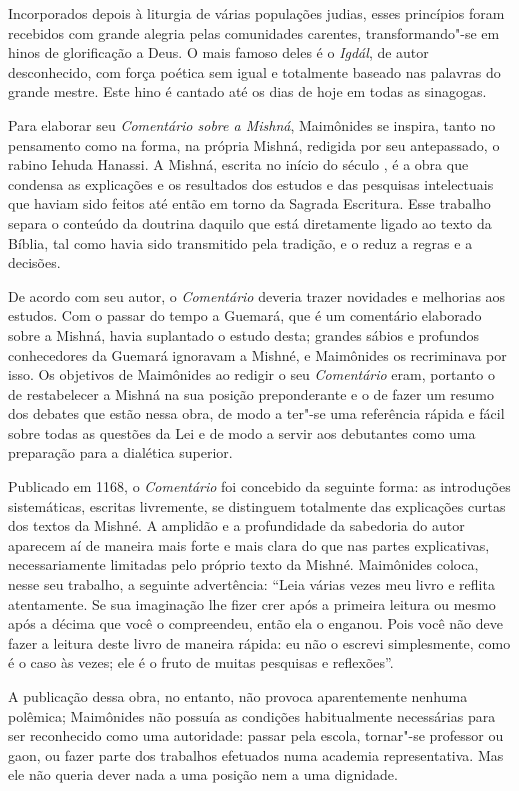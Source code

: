Incorporados depois à liturgia de várias populações judias, esses
princípios foram recebidos com grande alegria pelas comunidades
carentes, transformando"-se em hinos de glorificação a Deus. O mais
famoso deles é o \emph{Igdál}, de autor desconhecido, com força poética sem
igual e totalmente baseado nas palavras do grande mestre. Este hino é
cantado até os dias de hoje em todas as sinagogas.

Para elaborar seu \emph{Comentário sobre a Mishná}, Maimônides se
inspira, tanto no pensamento como na forma, na própria Mishná,
redigida por seu antepassado, o rabino Iehuda Hanassi. A Mishná, escrita no
início do século , é a obra que condensa as explicações e os
resultados dos estudos e das pesquisas intelectuais que haviam sido
feitos até então em torno da Sagrada Escritura. Esse trabalho separa o
conteúdo da doutrina daquilo que está diretamente ligado ao texto da
Bíblia, tal como havia sido transmitido pela tradição, e o reduz a
regras e a decisões.

De acordo com seu autor, o \emph{Comentário} deveria trazer novidades e
melhorias aos estudos. Com o passar do tempo a Guemará, que é um
comentário elaborado sobre a Mishná, havia suplantado o estudo
desta; grandes sábios e profundos conhecedores da Guemará
ignoravam a Mishné, e Maimônides os recriminava por isso. Os
objetivos de Maimônides ao redigir o seu \emph{Comentário} eram,
portanto o de restabelecer a Mishná na sua posição preponderante
e o de fazer um resumo dos debates que estão nessa obra, de modo a
ter"-se uma referência rápida e fácil sobre todas as questões da Lei e de
modo a servir aos debutantes como uma preparação para a dialética
superior.

Publicado em 1168, o \emph{Comentário} foi concebido da seguinte forma:
as introduções sistemáticas, escritas livremente, se distinguem
totalmente das explicações curtas dos textos da Mishné. A
amplidão e a profundidade da sabedoria do autor aparecem aí de maneira
mais forte e mais clara do que nas partes explicativas, necessariamente
limitadas pelo próprio texto da Mishné. Maimônides coloca, nesse
seu trabalho, a seguinte advertência: ``Leia várias vezes meu livro e
reflita atentamente. Se sua imaginação lhe fizer crer após a primeira
leitura ou mesmo após a décima que você o compreendeu, então ela o
enganou. Pois você não deve fazer a leitura deste livro de maneira
rápida: eu não o escrevi simplesmente, como é o caso às vezes; ele é o
fruto de muitas pesquisas e reflexões''.

A publicação dessa obra, no entanto, não provoca aparentemente nenhuma
polêmica; Maimônides não possuía as condições habitualmente necessárias
para ser reconhecido como uma autoridade: passar pela escola, tornar"-se
professor ou gaon, ou fazer parte dos trabalhos efetuados numa academia
representativa. Mas ele não queria dever nada a uma posição nem a uma
dignidade.

